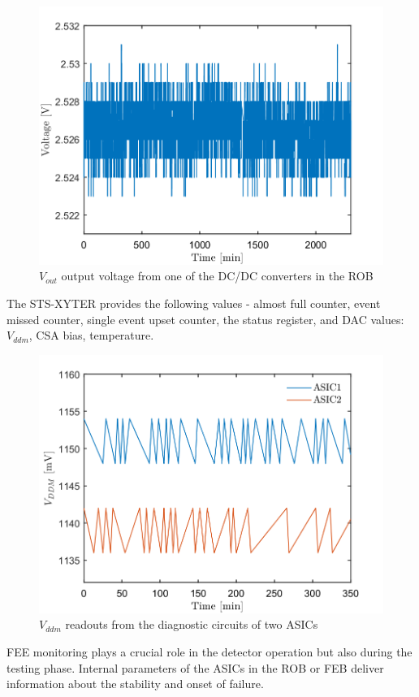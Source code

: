 \begin{figure}[!h]
    \centering
    \includegraphics[width=0.65\columnwidth]{Chapter4/images/ROB.png}
    \caption{$V_{out}$ output voltage from one of the DC/DC converters in the \gls{ROB}}
    \label{fig:ROB}
\end{figure}

The STS-XYTER provides the following values - almost full counter, event missed counter, single event upset counter, the status register, and \gls{DAC} values: $V_{ddm}$, \gls{CSA} bias, temperature. 

\begin{figure}[!h]
    \centering
    \includegraphics[width=0.65\columnwidth]{Chapter4/images/FEB.png}
    \caption{$V_{ddm}$ readouts from the diagnostic circuits of two ASICs}
    \label{fig:vddm_first}
\end{figure}

FEE monitoring plays a crucial role in the detector operation but also during the testing phase. Internal parameters of the ASICs in the \gls{ROB} or \gls{FEB} deliver information about the stability and onset of failure. %

